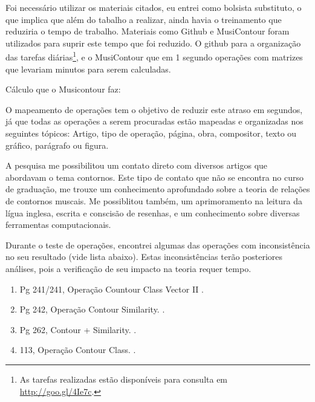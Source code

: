 \documentclass[11pt]{article}
\begin{document}

Foi necessário utilizar os materiais citados, eu entrei como bolsista
substituto, o que implica que além do tabalho a realizar, ainda havia
o treinamento que reduziria o tempo de trabalho. Materiais como Github
e MusiContour foram utilizados para suprir este tempo que foi
reduzido. O github para a organização das tarefas diárias\footnote{As
  tarefas realizadas estão disponíveis para consulta em
  \url{http://goo.gl/4Ie7c}.}, e o MusiContour que em 1 segundo
operações com matrizes que levariam minutos para serem calculadas.

Cálculo que o Musicontour faz:


O mapeamento de operações tem o objetivo de reduzir este atraso em
segundos, já que todas as operações a serem procuradas estão mapeadas
e organizadas nos seguintes tópicos: Artigo, tipo de operação, página,
obra, compositor, texto ou gráfico, parágrafo ou figura.

A pesquisa me possibilitou um contato direto com diversos artigos que abordavam
o tema contornos. Este tipo de contato que não se encontra no curso de graduação,
me trouxe um conhecimento aprofundado sobre a teoria de relações de contornos muscais.
Me possiblitou também, um aprimoramento na leitura da lígua inglesa, escrita e conscisão
de resenhas, e um conhecimento sobre diversas ferramentas computacionais.

Durante o teste de operações, encontrei algumas das operações com
inconsistência no seu resultado (vide lista abaixo). Estas inconsistências terão posteriores
análises, pois a verificação de seu impacto na teoria requer tempo.

\begin{enumerate}
\item Pg 241/241, Operação Countour Class Vector II \cite[p. 241]{Friedmann1985}.
\item Pg 242, Operação Contour Similarity. \cite[p. 241]{Quinn1997}.
\item Pg 262, Contour + Similarity. \cite[p. 241]{Quinn1997}.
\item 113, Operação Contour Class. \cite[p. 241]{Schultz2008}.
\end{enumerate}
\end{document}
